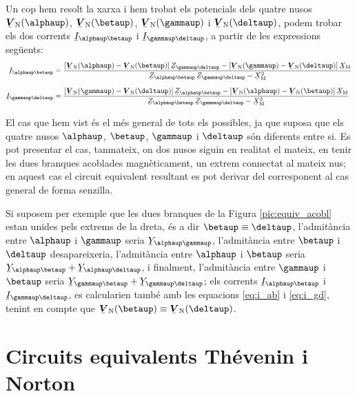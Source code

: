 Un cop hem resolt la xarxa i hem trobat els potencials dels quatre
nusos $\mcmplx{V}\ped{N}(\alphaup)$, $\mcmplx{V}\ped{N}(\betaup)$,
$\mcmplx{V}\ped{N}(\gammaup)$ i $\mcmplx{V}\ped{N}(\deltaup)$, podem
trobar els dos corrents $\cmplx{I}_{\alphaup\betaup}$ i
$\cmplx{I}_{\gammaup\deltaup}$, a partir de les expressions següents:
\begin{subequations}
\begin{align}
    \cmplx{I}_{\alphaup\betaup} &=  \frac{[\mcmplx{V}\ped{N}(\alphaup) - \mcmplx{V}\ped{N}(\betaup)] \, \cmplx{Z}_{\gammaup\deltaup} - [\mcmplx{V}\ped{N}(\gammaup) - \mcmplx{V}\ped{N}(\deltaup)] \,
    \cmplx{X}\ped{M}}{\cmplx{Z}_{\alphaup\betaup}\,
    \cmplx{Z}_{\gammaup\deltaup}-\cmplx{X}\ped{M}^2} \label{eq:i_ab}
    \\[1.5ex]
    \cmplx{I}_{\gammaup\deltaup} &= \frac{[\mcmplx{V}\ped{N}(\gammaup) - \mcmplx{V}\ped{N}(\deltaup)] \, \cmplx{Z}_{\alphaup\betaup} - [\mcmplx{V}\ped{N}(\alphaup) - \mcmplx{V}\ped{N}(\betaup)] \,
    \cmplx{X}\ped{M}}{\cmplx{Z}_{\alphaup\betaup}\,
    \cmplx{Z}_{\gammaup\deltaup}-\cmplx{X}\ped{M}^2} \label{eq:i_gd}
\end{align}
\end{subequations}

El cas que hem vist  és el més general de tots els
possibles, ja que suposa que els quatre nusos $\alphaup$, $\betaup$,
$\gammaup$ i $\deltaup$ són diferents entre si. Es pot presentar el cas,
tanmateix, on dos nusos siguin en realitat el mateix, en tenir les
dues branques acoblades magnèticament, un extrem connectat al mateix
nus; en aquest cas el circuit equivalent resultant es pot derivar
del corresponent al cas general de forma senzilla.

Si suposem per exemple que les dues branques de la Figura
\vref{pic:equiv_acobl} estan unides pels extrems de la dreta,
és a dir $\betaup\equiv\deltaup$, l'admitància entre
$\alphaup$ i $\gammaup$ seria $\cmplx{Y}_{\alphaup\gammaup}$, l'admitància
entre $\betaup$ i $\deltaup$ desapareixeria, l'admitància entre $\alphaup$
i $\betaup$ seria $\cmplx{Y}_{\alphaup\betaup} +
\cmplx{Y}_{\alphaup\deltaup}$, i finalment, l'admitància entre $\gammaup$
i $\betaup$ seria $\cmplx{Y}_{\gammaup\betaup} +
\cmplx{Y}_{\gammaup\deltaup}$; els corrents $\cmplx{I}_{\alphaup\betaup}$ i
$\cmplx{I}_{\gammaup\deltaup}$, es calcularien també amb les equacions
\eqref{eq:i_ab} i \eqref{eq:i_gd}, tenint en compte que
$\mcmplx{V}\ped{N}(\betaup)\equiv\mcmplx{V}\ped{N}(\deltaup)$.

\section{Circuits equivalents Thévenin i Norton}   \label{sec:xarxes_Zth}

